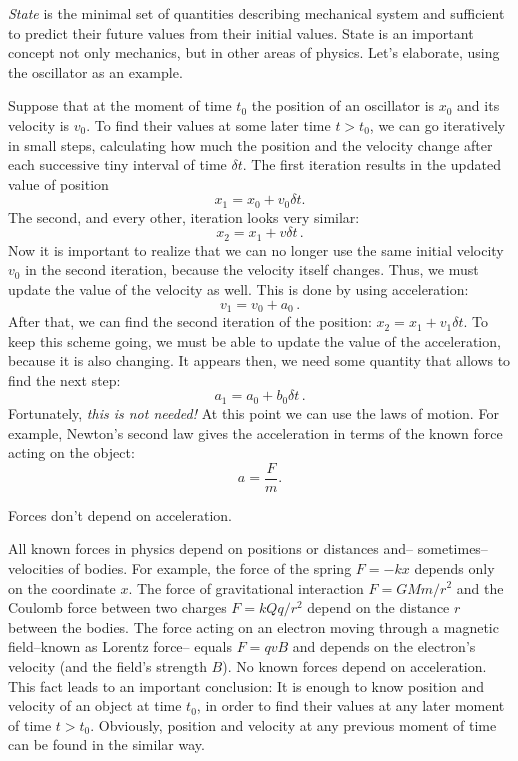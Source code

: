 \emph{State} is the minimal set of quantities describing mechanical
system and sufficient to predict
their future values from their initial values. State is an important
concept not only mechanics, but in other areas of physics.
Let's elaborate, using the oscillator as an example.

Suppose that at the moment of time $t_{0}$ the position of an oscillator
is $x_{0}$ and its velocity is $v_{0}$. To find their values at
some later time $t>t_{0}$, we can go iteratively in small steps, calculating
how much the position and the velocity change after each successive
tiny interval of time $\delta t$. The first iteration results in
the updated value of position
\[
	x_{1}=x_{0}+v_{0}\delta t.
\]
The second, and every other, iteration looks very similar:
\[
	x_{2}=x_{1}+v\delta t\,.
\]
Now it is important to realize that we can no longer use the same initial
velocity $v_{0}$ in the second iteration, because the velocity itself
changes. Thus, we must update the value of the velocity as well. This
is done by using acceleration:
\[
	v_{1}=v_{0}+a_{0}\,.
\]
After that, we can find the second iteration of the position:
$x_{2}=x_{1}+v_{1}\delta t$. To keep this scheme going, we must be
able to update the value of the acceleration, because it is also changing.
It appears then, we need some quantity that allows to find the next
step:
\[
	a_{1}=a_{0}+b_{0}\delta t\,.
\]
Fortunately, \emph{this is not needed!} At this point we can use the laws of motion.
For example, Newton's second law gives the acceleration in terms of the known force acting on the object:
\begin{equation}
	a=\frac{F}{m}.
\end{equation}
\begin{important}
	Forces don't depend on acceleration.
\end{important}

All known forces in physics depend on positions or distances and--
sometimes-- velocities of bodies. For example, the force of the spring $F=-kx$
depends only on the coordinate $x$. The force of gravitational interaction $F=GMm/r^2$
and the Coulomb force between two charges $F=kQq/r^2$ depend on the distance
$r$ between the bodies. The force acting on an electron moving through
a magnetic field--known as Lorentz force-- equals $F=qvB$ and 
depends on the electron's velocity (and the field's strength $B$). 
No known forces depend on acceleration. This fact leads to an important conclusion:
It is enough to know position and velocity of an object at time $t_{0}$,
in order to find their values at any later moment of time $t>t_{0}$.
Obviously, position and velocity at any previous moment of time can
be found in the similar way.

